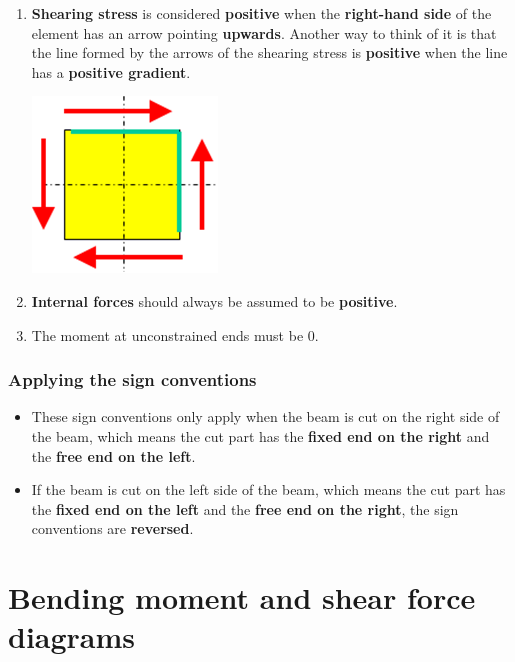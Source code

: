\documentclass[11pt]{article}
\begin{document}
\begin{enumerate}
\item \textbf{Shearing stress} is considered \textbf{positive} when the \textbf{right-hand side} of the element has an arrow pointing \textbf{upwards}. Another way to think of it is that the line formed by the arrows of the shearing stress is \textbf{positive} when the line has a \textbf{positive gradient}.
\begin{center}
\includegraphics[scale=0.7]{./images/positive-shear-stress.png}
\end{center}

\item \textbf{Internal forces} should always be assumed to be \textbf{positive}.
\item The moment at unconstrained ends must be 0.
\end{enumerate}

\newpage
\subsubsection{Applying the sign conventions}
\label{sec:org2e157ec}
\begin{itemize}
\item These sign conventions only apply when the beam is cut on the right side of the beam, which means the cut part has the \textbf{fixed end on the right} and the \textbf{free end on the left}.
\item If the beam is cut on the left side of the beam, which means the cut part has the \textbf{fixed end on the left} and the \textbf{free end on the right}, the sign conventions are \textbf{reversed}.
\end{itemize}
\section{Bending moment and shear force diagrams}
\label{sec:org46a3706}
\end{document}
